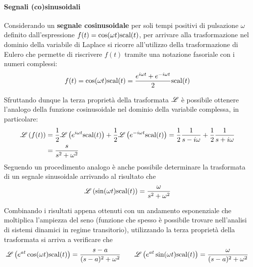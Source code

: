 	    \paragraph{Segnali (co)sinusoidali} Considerando un \textbf{segnale cosinusoidale} per soli tempi positivi di pulsazione $\omega$ definito dall'espressione $f(t) = \cos(\omega t)\textrm{scal}(t)$, per arrivare alla trasformazione nel dominio della variabile di Laplace si ricorre all'utilizzo della trasformazione di Eulero che permette di riscrivere $f(t)$ tramite una notazione fasoriale con i numeri complessi:
	    \[ f(t) = \cos(\omega t) \textrm{scal}(t) = \frac{e^{i\omega t}+ e^{-i\omega t}}{2} \textrm{scal}(t)\]
	    
	    Sfruttando dunque la terza proprietà della trasformata $\mathscr L$ è possibile ottenere l'analogo della funzione cosinusoidale nel dominio della variabile complessa, in particolare:
	    \begin{equation}
	   	\begin{aligned}
	   		\mathscr L \left( f(t) \right) & = \frac 1 2 \mathscr L \left( e^{i\omega t}\textrm{scal}(t) \right) + \frac 1 2 \mathscr L \left( e^{-i\omega t} \textrm{scal}(t) \right) = \frac 1 2 \frac{1}{s-i\omega} + \frac 1 2 \frac{1}{s+i\omega} \\ & = \frac{s}{s^2+\omega^2}
	   	\end{aligned}
	    \end{equation}
	    Seguendo un procedimento analogo è anche possibile determinare la trasformata di un segnale sinusoidale arrivando al risultato che
	    \begin{equation}
	    	\mathscr L \left( \sin(\omega t) \textrm{scal}(t) \right) = \frac \omega {s^2 + \omega^2}
	    \end{equation}
	    
	    Combinando i risultati appena ottenuti con un andamento esponenziale che moltiplica l'ampiezza del seno (funzione che spesso è possibile trovare nell'analisi di sistemi dinamici in regime transitorio), utilizzando la terza proprietà della trasformata si arriva a verificare che
	    \[ \mathscr L \left( e^{at}\cos(\omega t) \textrm{scal} (t) \right) = \frac{s-a}{(s-a)^2+\omega^2} \qquad \mathscr L \left( e^{at}\sin(\omega t) \textrm{scal} (t) \right) = \frac{\omega}{(s-a)^2+\omega^2} \]
	    
